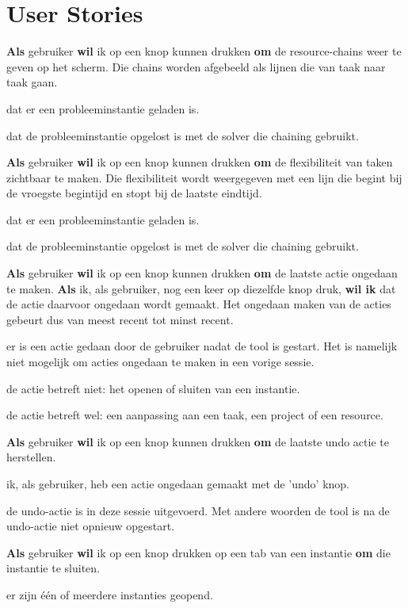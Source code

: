 \section{User Stories}
\setcounter{userstory}{0}
\nextUserStory
\textbf{Als} gebruiker \textbf{wil} ik op een knop kunnen drukken \textbf{om} de resource-chains weer te geven op het scherm. Die chains worden afgebeeld als lijnen die van taak naar taak gaan. 
\beginGegeven
    \item dat er een probleeminstantie geladen is.
    \item dat de probleeminstantie opgelost is met de solver die chaining gebruikt. 
\endGegeven

\nextUserStory
\textbf{Als} gebruiker \textbf{wil} ik op een knop kunnen drukken \textbf{om} de flexibiliteit van taken zichtbaar te maken. Die flexibiliteit wordt weergegeven met een lijn die begint bij de vroegste begintijd en stopt bij de laatste eindtijd.
\beginGegeven
    \item dat er een probleeminstantie geladen is.
    \item dat de probleeminstantie opgelost is met de solver die chaining gebruikt. 
\endGegeven

\nextUserStory
\textbf{Als} gebruiker \textbf{wil} ik op een knop kunnen drukken \textbf{om} de laatste actie ongedaan te maken. \textbf{Als} ik, als gebruiker, nog een keer op diezelfde knop druk, \textbf{wil ik} dat de actie daarvoor ongedaan wordt gemaakt. Het ongedaan maken van de acties gebeurt dus van meest recent tot minst recent. 
\beginGegeven
    \item er is een actie gedaan door de gebruiker nadat de tool is gestart. Het is namelijk niet mogelijk om acties ongedaan te maken in een vorige sessie. 
    \item de actie betreft niet: het openen of sluiten van een instantie.
    \item de actie betreft wel: een aanpassing aan een taak, een project of een resource. 
\endGegeven

\nextUserStory
\textbf{Als} gebruiker \textbf{wil} ik op een knop kunnen drukken \textbf{om} de laatste undo actie te herstellen.
\beginGegeven
    \item ik, als gebruiker, heb een actie ongedaan gemaakt met de 'undo' knop. 
    \item de undo-actie is in deze sessie uitgevoerd. Met andere woorden de tool is na de undo-actie niet opnieuw opgestart. 
\endGegeven

\nextUserStory
\textbf{Als} gebruiker \textbf{wil} ik op een knop drukken op een tab van een instantie \textbf{om} die instantie te sluiten. 
\beginGegeven
    \item er zijn \'e\'en of meerdere instanties geopend.
\endGegeven

